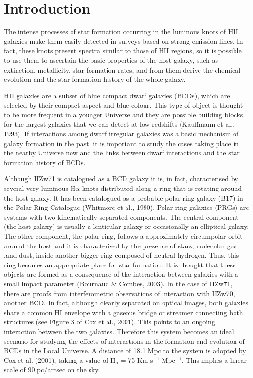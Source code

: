 \documentclass[structabstract]{aa}
\begin{document}
%

\section{Introduction}

The intense processes of star formation occurring in the luminous knots of
HII galaxies make them easily detected in surveys based on strong
emission lines. In fact, these knots present spectra similar to those of 
HII regions, so it is possible to use them to ascertain the basic properties 
of the host galaxy, such as extinction, metallicity, star formation rates, 
and from them derive the chemical evolution and the star formation history of 
the whole galaxy.

HII galaxies are a subset of blue compact dwarf galaxies (BCDs), which are
selected by their compact aspect and blue colour.
This type of object is thought to be more frequent in a younger Universe and 
they are possible building blocks for the largest galaxies that we can detect at 
low redshifts (Kauffmann et al., 1993). If interactions among dwarf irregular galaxies was a basic 
mechanism of galaxy formation in the past, it is important to study the cases 
taking place in the nearby Universe now and the links between dwarf interactions and the
star formation history of BCDs.

Although IIZw71 is catalogued as a BCD galaxy it is, in fact, characterised by several very 
luminous H$\alpha$ knots distributed along a ring that is rotating around the host galaxy. It has been catalogued as a
probable polar-ring galaxy (B17) in the Polar-Ring Catalogue (Whitmore et al., 1990). 
Polar ring galaxies (PRGs) are systems with two kinematically separated components. The central component (the host galaxy)
is usually a lenticular galaxy or occasionally an elliptical galaxy. The other component, the polar ring, follows a
approximately circumpolar orbit around the host and it is characterised by the presence of stars, molecular gas ,and dust, inside another bigger ring composed of neutral hydrogen. Thus, this ring becomes an appropriate place for star formation.
It is thought that these objects are formed as a consequence of the
interaction between galaxies with a small impact parameter (Bournaud \& Combes, 2003). In the case of IIZw71, there are proofs from
interferometric observations of interaction with IIZw70, another BCD. In fact, although clearly separated on optical images, both galaxies share a common HI envelope with a gaseous bridge or streamer connecting both structures (see Figure 3 of Cox et al., 2001). This points to an ongoing interaction between the two galaxies.
Therefore this system becomes an ideal scenario for studying the effects of interactions in the formation and evolution of BCDs in the Local Universe. A distance of 18.1 Mpc to the system is adopted by Cox et al. (2001), taking a value of H$_o$ = 75 Km s$^{-1}$ Mpc$^{-1}$. This implies a linear scale of 90 pc/arcsec on the sky.
\end{document}
